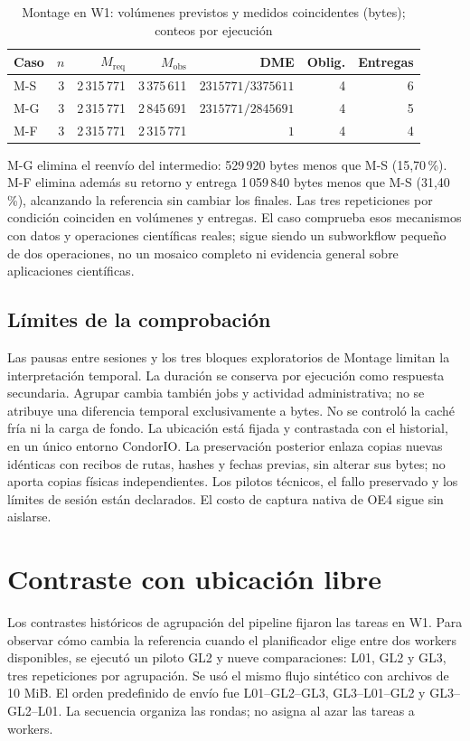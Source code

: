 \begin{table}[htbp]\centering\small
\caption{Montage en W1: volúmenes previstos y medidos coincidentes (bytes); conteos por ejecución}\label{tab:montage_agrupacion}
\begin{tabular}{@{}lrrrrrr@{}}
\toprule Caso & $n$ & $M_{\mathrm{req}}$ & $M_{\mathrm{obs}}$ & DME & Oblig. & Entregas\\\midrule
M-S & 3 & 2\,315\,771 & 3\,375\,611 & $2315771/3375611$ & 4 & 6\\
M-G & 3 & 2\,315\,771 & 2\,845\,691 & $2315771/2845691$ & 4 & 5\\
M-F & 3 & 2\,315\,771 & 2\,315\,771 & $1$ & 4 & 4\\
\bottomrule\end{tabular}
\end{table}
M-G elimina el reenvío del intermedio: 529\,920 bytes menos que M-S (15,70\,\%). M-F elimina además su retorno y entrega 1\,059\,840 bytes menos que M-S (31,40\,\%), alcanzando la referencia sin cambiar los finales. Las tres repeticiones por condición coinciden en volúmenes y entregas. El caso comprueba esos mecanismos con datos y operaciones científicas reales; sigue siendo un subworkflow pequeño de dos operaciones, no un mosaico completo ni evidencia general sobre aplicaciones científicas.

\subsection{Límites de la comprobación}
Las pausas entre sesiones y los tres bloques exploratorios de Montage limitan la interpretación temporal. La duración se conserva por ejecución como respuesta secundaria. Agrupar cambia también jobs y actividad administrativa; no se atribuye una diferencia temporal exclusivamente a bytes. No se controló la caché fría ni la carga de fondo. La ubicación está fijada y contrastada con el historial, en un único entorno CondorIO. La preservación posterior enlaza copias nuevas idénticas con recibos de rutas, hashes y fechas previas, sin alterar sus bytes; no aporta copias físicas independientes. Los pilotos técnicos, el fallo preservado y los límites de sesión están declarados. El costo de captura nativa de OE4 sigue sin aislarse.

\section{Contraste con ubicación libre}
\label{sec:ubicacion_libre}
Los contrastes históricos de agrupación del pipeline fijaron las tareas en W1. Para observar cómo cambia la referencia cuando el planificador elige entre dos workers disponibles, se ejecutó un piloto GL2 y nueve comparaciones: L01, GL2 y GL3, tres repeticiones por agrupación. Se usó el mismo flujo sintético con archivos de 10 MiB. El orden predefinido de envío fue L01--GL2--GL3, GL3--L01--GL2 y GL3--GL2--L01. La secuencia organiza las rondas; no asigna al azar las tareas a workers.

